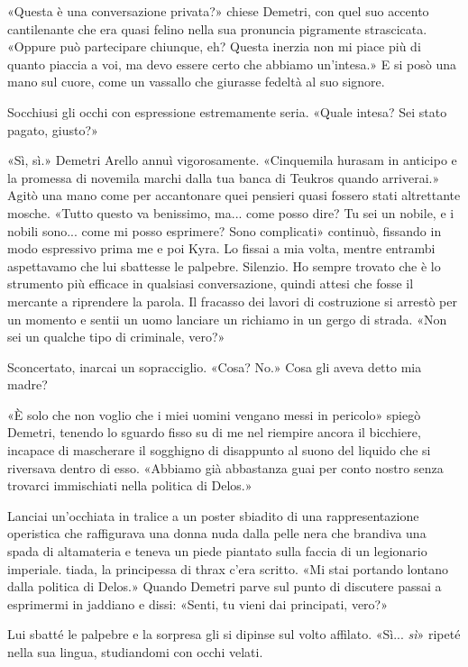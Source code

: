 «Questa è una conversazione privata?» chiese Demetri, con quel suo
accento cantilenante che era quasi felino nella sua pronuncia pigramente
strascicata. «Oppure può partecipare chiunque, eh? Questa inerzia non mi
piace più di quanto piaccia a voi, ma devo essere certo che abbiamo
un'intesa.» E si posò una mano sul cuore, come un vassallo che giurasse
fedeltà al suo signore.

Socchiusi gli occhi con espressione estremamente seria. «Quale intesa?
Sei stato pagato, giusto?»

«Sì, sì.» Demetri Arello annuì vigorosamente. «Cinquemila hurasam in
anticipo e la promessa di novemila marchi dalla tua banca di Teukros
quando arriverai.» Agitò una mano come per accantonare quei pensieri
quasi fossero stati altrettante mosche. «Tutto questo va benissimo,
ma... come posso dire? Tu sei un nobile, e i nobili sono... come mi
posso esprimere? Sono complicati» continuò, fissando in modo espressivo
prima me e poi Kyra. Lo fissai a mia volta, mentre entrambi aspettavamo
che lui sbattesse le palpebre. Silenzio. Ho sempre trovato che è lo
strumento più efficace in qualsiasi conversazione, quindi attesi che
fosse il mercante a riprendere la parola. Il fracasso dei lavori di
costruzione si arrestò per un momento e sentii un uomo lanciare un
richiamo in un gergo di strada. «Non sei un qualche tipo di criminale,
vero?»

Sconcertato, inarcai un sopracciglio. «Cosa? No.» Cosa gli aveva detto
mia madre?

«È solo che non voglio che i miei uomini vengano messi in pericolo»
spiegò Demetri, tenendo lo sguardo fisso su di me nel riempire ancora il
bicchiere, incapace di mascherare il sogghigno di disappunto al suono
del liquido che si riversava dentro di esso. «Abbiamo già abbastanza
guai per conto nostro senza trovarci immischiati nella politica di
Delos.»

Lanciai un'occhiata in tralice a un poster sbiadito di una
rappresentazione operistica che raffigurava una donna nuda dalla pelle
nera che brandiva una spada di altamateria e teneva un piede piantato
sulla faccia di un legionario imperiale.
\foreignlanguage{italian}{tiada, la principessa di thrax} c'era scritto.
«Mi stai portando lontano dalla politica di Delos.» Quando Demetri parve
sul punto di discutere passai a esprimermi in jaddiano e dissi: «Senti,
tu vieni dai principati, vero?»

Lui sbatté le palpebre e la sorpresa gli si dipinse sul volto affilato.
«Sì... \emph{sì}» ripeté nella sua lingua, studiandomi con occhi velati.


